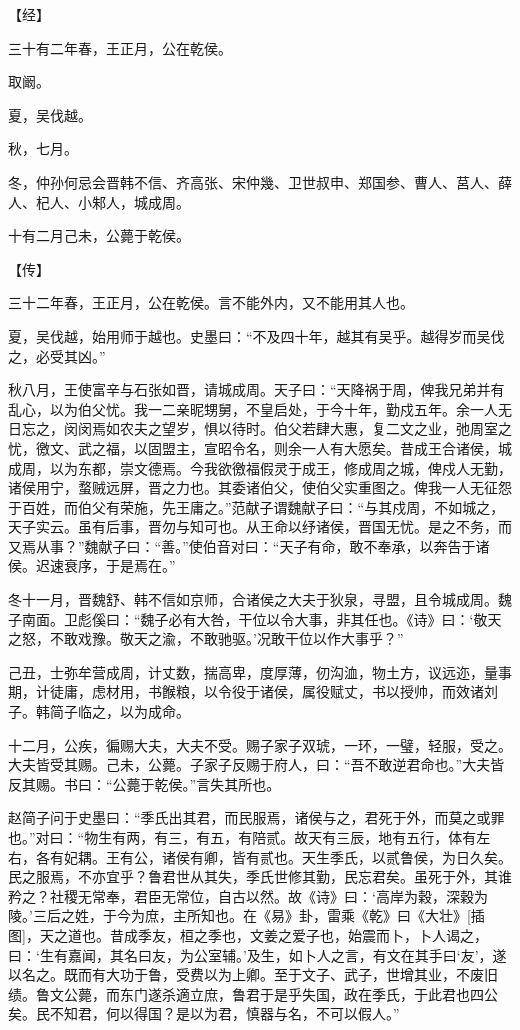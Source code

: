 \documentclass[a4paper,12pt,UTF8,twoside]{ctexbook}
\begin{document}
【经】

三十有二年春，王正月，公在乾侯。

取阚。

夏，吴伐越。

秋，七月。

冬，仲孙何忌会晋韩不信、齐高张、宋仲幾、卫世叔申、郑国参、曹人、莒人、薛人、杞人、小邾人，城成周。

十有二月己未，公薨于乾侯。

【传】

三十二年春，王正月，公在乾侯。言不能外内，又不能用其人也。

夏，吴伐越，始用师于越也。史墨曰：“不及四十年，越其有吴乎。越得岁而吴伐之，必受其凶。”

秋八月，王使富辛与石张如晋，请城成周。天子曰：“天降祸于周，俾我兄弟并有乱心，以为伯父忧。我一二亲昵甥舅，不皇启处，于今十年，勤戍五年。余一人无日忘之，闵闵焉如农夫之望岁，惧以待时。伯父若肆大惠，复二文之业，弛周室之忧，徼文、武之福，以固盟主，宣昭令名，则余一人有大愿矣。昔成王合诸侯，城成周，以为东都，崇文德焉。今我欲徼福假灵于成王，修成周之城，俾戍人无勤，诸侯用宁，蝥贼远屏，晋之力也。其委诸伯父，使伯父实重图之。俾我一人无征怨于百姓，而伯父有荣施，先王庸之。”范献子谓魏献子曰：“与其戍周，不如城之，天子实云。虽有后事，晋勿与知可也。从王命以纾诸侯，晋国无忧。是之不务，而又焉从事？”魏献子曰：“善。”使伯音对曰：“天子有命，敢不奉承，以奔告于诸侯。迟速衰序，于是焉在。”

冬十一月，晋魏舒、韩不信如京师，合诸侯之大夫于狄泉，寻盟，且令城成周。魏子南面。卫彪傒曰：“魏子必有大咎，干位以令大事，非其任也。《诗》曰：‘敬天之怒，不敢戏豫。敬天之渝，不敢驰驱。’况敢干位以作大事乎？”

己丑，士弥牟营成周，计丈数，揣高卑，度厚薄，仞沟洫，物土方，议远迩，量事期，计徒庸，虑材用，书餱粮，以令役于诸侯，属役赋丈，书以授帅，而效诸刘子。韩简子临之，以为成命。

十二月，公疾，徧赐大夫，大夫不受。赐子家子双琥，一环，一璧，轻服，受之。大夫皆受其赐。己未，公薨。子家子反赐于府人，曰：“吾不敢逆君命也。”大夫皆反其赐。书曰：“公薨于乾侯。”言失其所也。

赵简子问于史墨曰：“季氏出其君，而民服焉，诸侯与之，君死于外，而莫之或罪也。”对曰：“物生有两，有三，有五，有陪贰。故天有三辰，地有五行，体有左右，各有妃耦。王有公，诸侯有卿，皆有贰也。天生季氏，以贰鲁侯，为日久矣。民之服焉，不亦宜乎？鲁君世从其失，季氏世修其勤，民忘君矣。虽死于外，其谁矜之？社稷无常奉，君臣无常位，自古以然。故《诗》曰：‘高岸为穀，深穀为陵。’三后之姓，于今为庶，主所知也。在《易》卦，雷乘《乾》曰《大壮》[插图]，天之道也。昔成季友，桓之季也，文姜之爱子也，始震而卜，卜人谒之，曰：‘生有嘉闻，其名曰友，为公室辅。’及生，如卜人之言，有文在其手曰‘友’，遂以名之。既而有大功于鲁，受费以为上卿。至于文子、武子，世增其业，不废旧绩。鲁文公薨，而东门遂杀適立庶，鲁君于是乎失国，政在季氏，于此君也四公矣。民不知君，何以得国？是以为君，慎器与名，不可以假人。”
\end{document}
